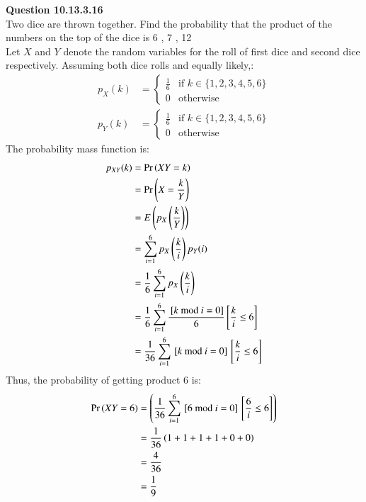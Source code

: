 \documentclass[journal,12pt,onecolumn]{IEEEtran}
\begin{document}
\vspace{3cm}
\title{}
\author{EE22BTECH11049 - Shivansh Kirar}
\maketitle
\textbf{Question 10.13.3.16}\\
Two dice are thrown together. Find the probability that the product of the numbers on the top of the dice is 6 , 7 , 12 \\
\solution
\fi
Let $X$ and $Y$ denote the random variables for the roll of first dice and second dice respectively.
Assuming both dice rolls and equally likely,:
\begin{align}
        p_X(k) &= 
        \begin{cases}
            \frac{1}{6} & \text{if }k \in \{1, 2, 3, 4, 5, 6\}\\
            0 & \text{otherwise}
        \end{cases}\label{eq:1}\\
        p_Y(k) &=
        \begin{cases}
            \frac{1}{6} & \text{if }k \in \{1, 2, 3, 4, 5, 6\}\\
            0 & \text{otherwise}
        \end{cases}
\end{align}
The probability mass function is:
\begin{align}
        p_{XY}(k) &= \Pr\left(XY = k\right)\\
        &= \Pr\left(X = \frac{k}{Y}\right)\\
        &= E\left(p_X\left(\frac{k}{Y}\right)\right)\\
        &= \sum_{i = 1}^{6} p_X\left(\frac{k}{i}\right) p_Y(i)\\
        &= \frac{1}{6} \sum_{i = 1}^{6} p_X\left(\frac{k}{i}\right)\\
        &= \frac{1}{6} \sum_{i = 1}^{6} \frac{{}\left[k \text{ mod } i = 0\right]}{6}{}\left[\frac{k}{i} \leq 6\right]\\
        &= \frac{1}{36} \sum_{i = 1}^{6} {}\left[k \text{ mod } i = 0\right]{}\left[\frac{k}{i} \leq 6\right]
\end{align}
Thus, the probability of getting product 6 is:
\begin{align}
    \Pr\left(XY = 6\right) &= \left(\frac{1}{36}\sum_{i = 1}^{6} {}\left[6 \text{ mod } i = 0\right]{}\left[\frac{6}{i} \leq 6\right]\right) \\
    &= \frac{1}{36} \left( 1 + 1 + 1 + 1 + 0 + 0  \right) \\
    &= \frac{4}{36} \\
    &= \frac{1}{9} 
\end{align}
\end{document}
